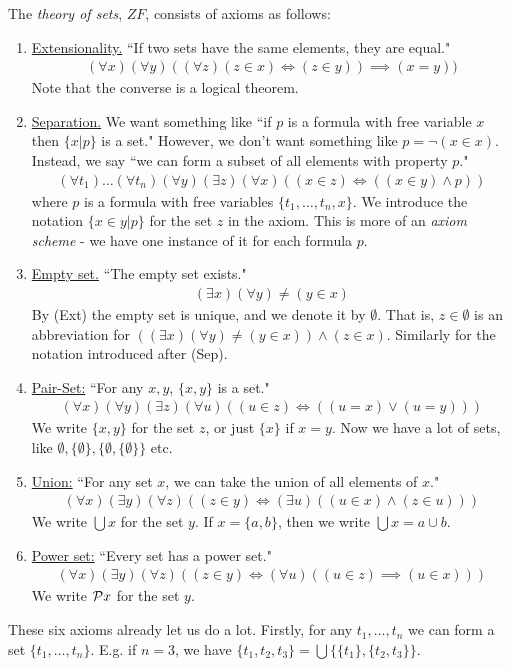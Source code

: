 \documentclass[10pt,a4paper]{article}
\begin{document}
The \emph{theory of sets}, $ZF$, consists of axioms as follows:
\begin{enumerate}
\item \underline{Extensionality.} ``If two sets have the same elements, they are equal."
\begin{align*}
(\forall x)(\forall y)((\forall z)(z \in x) \iff (z\in y)) \implies (x=y))\tag{Ext}
\end{align*}
Note that the converse is a logical theorem.
\item \underline{Separation.} We want something like ``if $p$ is a formula with free variable $x$ then $\{x|p\}$ is a set." However, we don't want something like $p = \neg (x \in x)$. Instead, we say ``we can form a subset of all elements with property $p$."
\begin{align*}
(\forall t_1)\ldots(\forall t_n)(\forall y)(\exists z)(\forall x)((x \in z) \iff ((x \in y)\wedge p))\tag{Sep}
\end{align*}
where $p$ is a formula with free variables $\{t_1, \ldots, t_n, x\}$. We introduce the notation $\{x \in y|p\}$ for the set $z$ in the axiom. This is more of an \emph{axiom scheme} - we have one instance of it for each formula $p$.
\item \underline{Empty set.} ``The empty set exists."
\begin{align*}
(\exists x)(\forall y) \neq (y \in x) \tag{Emp}
\end{align*}
By (Ext) the empty set is unique, and we denote it by $\emptyset$. That is, $z \in \emptyset$ is an abbreviation for $((\exists x)(\forall y) \neq (y \in x))\wedge (z \in x)$. Similarly for the notation introduced after (Sep).
\item \underline{Pair-Set:} ``For any $x,y$, $\{x,y\}$ is a set."
\begin{align*}
(\forall x)(\forall y)(\exists z)(\forall u)((u \in z)\iff((u=x)\vee(u=y)))\tag{Pair}
\end{align*}
We write $\{x,y\}$ for the set $z$, or just $\{x\}$ if $x=y$. Now we have a lot of sets, like $\emptyset, \{\emptyset\}, \{\emptyset, \{\emptyset\}\}$ etc.
\item \underline{Union:} ``For any set $x$, we can take the union of all elements of $x$."
\begin{align*}
(\forall x)(\exists y)(\forall z)((z \in y)\iff(\exists u)((u \in x)\wedge(z \in u)))\tag{Un}
\end{align*}
We write $\bigcup x$ for the set $y$. If $x = \{a,b\}$, then we write $\bigcup x = a \cup b$.
\item \underline{Power set:} ``Every set has a power set."
\begin{align*}
(\forall x)(\exists y)(\forall z)((z \in y) \iff(\forall u)((u \in z)\implies (u \in x)))\tag{Pow}
\end{align*}
We write $\mathcal{P}{x}$ for the set $y$.
\end{enumerate}
These six axioms already let us do a lot. Firstly, for any $t_1, \ldots, t_n$ we can form a set $\{t_1, \ldots, t_n\}$. E.g. if $n=3$, we have $\{t_1,t_2,t_3\} = \bigcup \{\{t_1\},\{t_2,t_3\}\}$.
 
\end{document}
